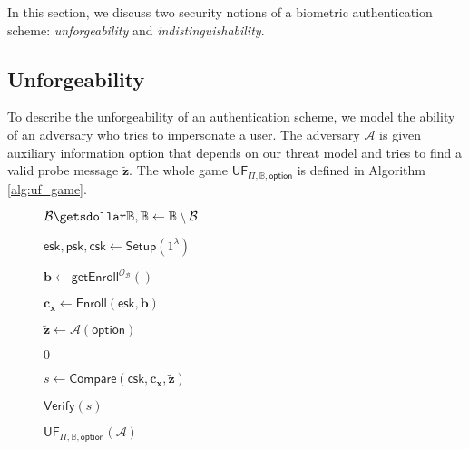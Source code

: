 


In this section, we discuss two security notions of a biometric authentication scheme: \emph{unforgeability} and \emph{indistinguishability}.

\subsection{Unforgeability}
\label{sec:uf_game}

To describe the unforgeability of an authentication scheme, we model the ability of an adversary who tries to impersonate a user. The adversary $\mathcal{A}$ is given auxiliary information \textsf{option} that depends on our threat model and tries to find a valid probe message $\mathbf{\tilde{z}}$. The whole game $\textsf{UF}_{\Pi, \mathbb{B}, \textsf{option}}$ is defined in Algorithm \ref{alg:uf_game}.

\begin{figure}[h]
\centering
	\begin{minipage}[t]{0.6\linewidth}
	\centering
	\begin{algorithm}[H]
	\caption{$\textsf{UF}_{\Pi, \mathbb{B}, \textsf{option}}(\mathcal{A})$}
	\label{alg:uf_game}
	\begin{algorithmic}[1]
		\State $\mathcal{B} \getsdollar \mathbb{B}, \mathbb{B} \gets \mathbb{B} \setminus \mathcal{B}$

		\State $\mathsf{esk}, \mathsf{psk}, \mathsf{csk} \gets \mathsf{Setup}(1^\lambda)$
		
		\State $\mathbf{b} \gets \mathsf{getEnroll}^{\mathcal{O}_{\mathcal{B}}}()$

		\State $\mathbf{c_x} \gets \mathsf{Enroll}(\mathsf{esk}, \mathbf{b})$
		
		\State ${\mathbf{\tilde{z}}} \gets \mathcal{A} ( \textsf{option} )$
 
			
			\State \Return $0$
		
		\EndIf

		\State $s \gets \mathsf{Compare}( \mathsf{csk}, \mathbf{c_x}, \mathbf{\tilde{z}} )$

		\State \Return $\mathsf{Verify}(s)$
	\end{algorithmic}
	\end{algorithm}
	\end{minipage}
	
\label{fig:uf_game}
\end{figure}

